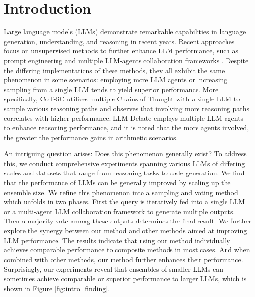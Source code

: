 \section{Introduction}



Large language models (LLMs) demonstrate remarkable capabilities in language generation, understanding, and reasoning in recent years. Recent approaches focus on unsupervised methods to further enhance LLM performance, such as prompt engineering \cite{iclsurvey} and multiple LLM-agents collaboration frameworks \cite{agentsurvey,agentsurvey1}. Despite the differing implementations of these methods, they all exhibit the same phenomenon in some scenarios: employing more LLM agents or increasing sampling from a single LLM tends to yield superior performance. More specifically, CoT-SC \cite{cotsc} utilizes multiple Chains of Thought \cite{cot} with a single LLM to sample various reasoning paths and observes that involving more reasoning paths correlates with higher performance. LLM-Debate \cite{debate} employs multiple LLM agents to enhance reasoning performance, and it is noted that the more agents involved, the greater the performance gains in arithmetic scenarios.

An intriguing question arises: Does this phenomenon generally exist? To address this, we conduct comprehensive experiments spanning various LLMs of differing scales and datasets that range from reasoning tasks to code generation. We find that the performance of LLMs can be generally improved by scaling up the ensemble size. We refine this phenomenon into a sampling and voting method which unfolds in two phases. First the query is iteratively fed into a single LLM or a multi-agent LLM collaboration framework to generate multiple outputs. Then a majority vote among these outputs determines the final result. We further explore the synergy between our method and other methods aimed at improving LLM performance. The results indicate that using our method individually achieves comparable performance to composite methods in most cases. And when combined with other methods, our method further enhances their performance. Surprisingly, our experiments reveal that ensembles of smaller LLMs can sometimes achieve comparable or superior performance to larger LLMs, which is shown in Figure \ref{fig:intro_finding}.

